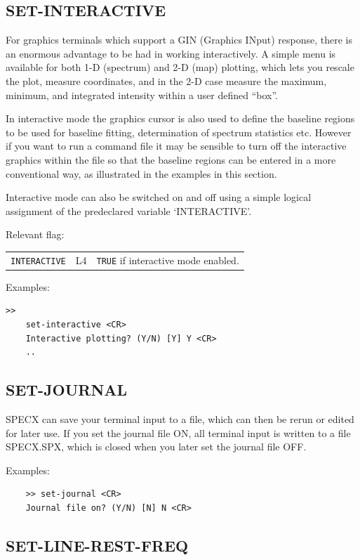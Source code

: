 \documentclass[11pt,twoside]{report}
\begin{document}
\subsection{SET-INTERACTIVE} 

For graphics terminals which support a GIN (Graphics INput) response,
there is an enormous advantage to be had in working interactively. A
simple menu is available for both 1-D (spectrum) and 2-D (map) plotting,
which lets you rescale the plot, measure coordinates, and in the 2-D case
measure the maximum, minimum, and integrated intensity within a user
defined ``box''.

In interactive mode the graphics cursor is also used to define the baseline
regions to be used for baseline fitting, determination of spectrum
statistics etc. However if you want to run a command file it may be sensible
to turn off the interactive graphics within the file so that the baseline
regions can be entered in a more conventional way, as illustrated in the
examples in this section.

Interactive mode can also be switched on and off using a simple logical
assignment of the predeclared variable `INTERACTIVE'.

Relevant flag:
\begin{tabular}{lll}
   \verb+INTERACTIVE+ & L4 & \verb$TRUE$ if interactive mode enabled.
\end{tabular}

Examples:
\begin{verbatim}
>>
    set-interactive <CR>
    Interactive plotting? (Y/N) [Y] Y <CR>
    ..
\end{verbatim}

\subsection{SET-JOURNAL} 

SPECX can save your terminal input to a file, which can then be rerun or edited
for later use. If you set the journal file ON, all terminal input is written to
a file SPECX.SPX,  which is closed when you later set the
journal file OFF. 

Examples:
\begin{verbatim}
    >> set-journal <CR>
    Journal file on? (Y/N) [N] N <CR>
\end{verbatim}

\subsection{SET-LINE-REST-FREQ} 
\end{document}
